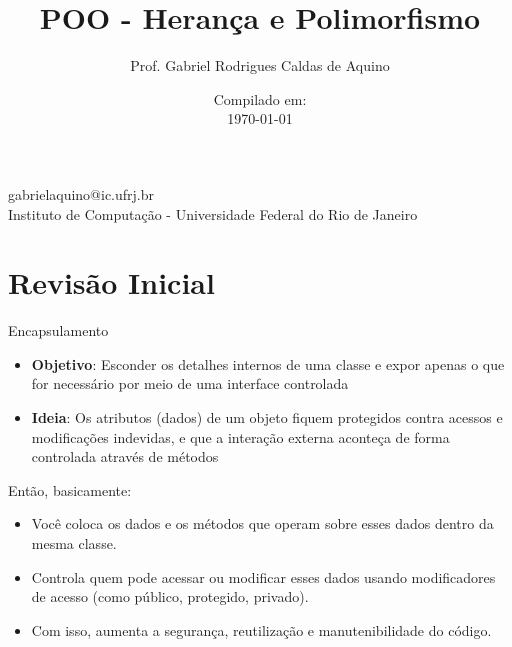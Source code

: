 \title{POO - Herança e Polimorfismo}

\author{Prof. Gabriel Rodrigues Caldas de Aquino}

\institute
{
    gabrielaquino@ic.ufrj.br\\
    
    Instituto de Computação -
    Universidade Federal do Rio de Janeiro %
}
\date{Compilado em: \\ \today} %


\section{Revisão Inicial}

\begin{frame}
    \titlepage
\end{frame}


\begin{frame}{Encapsulamento}

\begin{itemize}
    \item \textbf{Objetivo}: Esconder os detalhes internos de uma classe e expor apenas o que for necessário por meio de uma interface controlada

    \item \textbf{Ideia}: Os atributos (dados) de um objeto fiquem protegidos contra acessos e modificações indevidas, e que a interação externa aconteça de forma controlada através de métodos
\end{itemize}



\begin{block}{Então, basicamente:}
\begin{itemize}
    \item Você coloca os dados e os métodos que operam sobre esses dados dentro da mesma classe.

\item Controla quem pode acessar ou modificar esses dados usando modificadores de acesso (como público, protegido, privado).

\item Com isso, aumenta a segurança, reutilização e manutenibilidade do código.
\end{itemize}
\end{block}

\end{frame}





